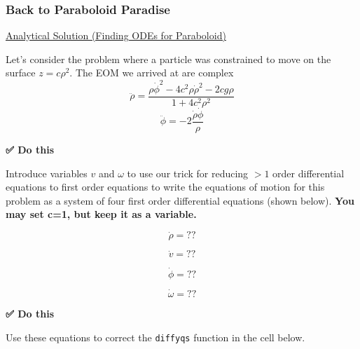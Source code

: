\subsubsection{Back to Paraboloid
Paradise}\label{back-to-paraboloid-paradise}

\href{../../assets/notes/Notes-Bead_in_a_Paraboloid.pdf}{Analytical
Solution (Finding ODEs for Paraboloid)}

Let's consider the problem where a particle was constrained to move on
the surface \(z = c\rho^2\). The EOM we arrived at are complex
\[\ddot{\rho} = \dfrac{\rho\dot{\phi}^2 - 4c^2\rho\dot{\rho}^2 -2cg\rho}{1 + 4c^2\rho^2}\]
\[\ddot{\phi} = -2\frac{\dot{\rho}\dot{\phi}}{\rho} \]

\textbf{✅ Do this}

Introduce variables \(v\) and \(\omega\) to use our trick for reducing
\(>1\) order differential equations to first order equations to write
the equations of motion for this problem as a system of four first order
differential equations (shown below). \textbf{You may set c=1, but keep
it as a variable.}

\[\dot{\rho} = ?? \]

\[\dot{v} = ??\]

\[\dot{\phi} = ?? \]

\[\dot{\omega} = ??\]

\textbf{✅ Do this}

Use these equations to correct the \texttt{diffyqs} function in the cell
below.


